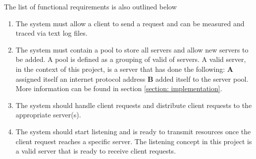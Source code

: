 \documentclass[12pt]{article}
\begin{document}
The list of functional requirements is also outlined below 
\begin{enumerate}
    \item The system must allow a client to send a request and can be measured and traced via text log files.
    \item The system must contain a pool to store all servers and allow new servers to be added. A pool is defined as a grouping of valid of servers. A valid server, in the context of this project, is a server that has done the following: \textbf{A} assigned itself an internet protocol address \textbf{B} added itself to the server pool. More information can be found in section \ref{section: implementation}.
    \item The system should handle client requests and distribute client requests to the appropriate server(s).
    \item The system should start listening and is ready to transmit resources once the client request reaches a specific server. The listening concept in this project is a valid server that is ready to receive client requests. 
\end{enumerate}
\end{document}
